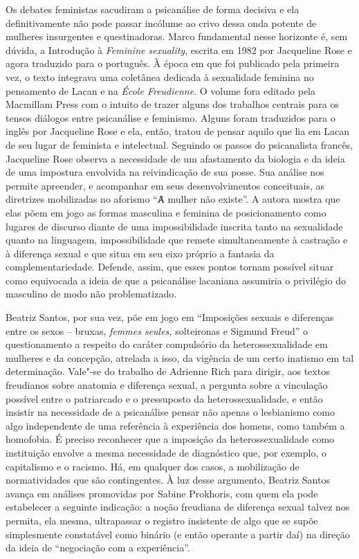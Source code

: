 Os debates feministas sacudiram a psicanálise de forma decisiva e ela
definitivamente não pode passar incólume ao crivo dessa onda potente de
mulheres insurgentes e questinadoras. Marco fundamental nesse horizonte
é, sem dúvida, a Introdução à \emph{Feminine sexuality}, escrita em 1982
por Jacqueline Rose e agora traduzido para o português. À época em que
foi publicado pela primeira vez, o texto integrava uma coletânea
dedicada à sexualidade feminina no pensamento de Lacan e na \emph{École
Freudienne}. O volume fora editado pela Macmillam Press com o intuito de
trazer alguns dos trabalhos centrais para os tensos diálogos entre
psicanálise e feminismo. Alguns foram traduzidos para o inglês por
Jacqueline Rose e ela, então, tratou de pensar aquilo que lia em Lacan
de seu lugar de feminista e intelectual. Seguindo os passos do
psicanalista francês, Jacqueline Rose observa a necessidade de um
afastamento da biologia e da ideia de uma impostura envolvida na
reivindicação de sua posse. Sua análise nos permite apreender, e
acompanhar em seus desenvolvimentos conceituais, as diretrizes
mobilizadas no aforismo ``Ⱥ mulher não existe''. A autora mostra que
elas põem em jogo as formas masculina e feminina de posicionamento como
lugares de discurso diante de uma impossibilidade inscrita tanto na
sexualidade quanto na linguagem, impossibilidade que remete
simultaneamente à castração e à diferença sexual e que situa em seu eixo
próprio a fantasia da complementariedade. Defende, assim, que esses
pontos tornam possível situar como equivocada a ideia de que a
psicanálise lacaniana assumiria o privilégio do masculino de modo não
problematizado.

Beatriz Santos, por sua vez, põe em jogo em ``Imposições sexuais e
diferenças entre os sexos -- bruxas, \emph{femmes seules,} solteironas e
Sigmund Freud'' o questionamento a respeito do caráter compulsório da
heterossexualidade em mulheres e da concepção, atrelada a isso, da
vigência de um certo inatismo em tal determinação. Vale"-se do trabalho
de Adrienne Rich para dirigir, aos textos freudianos sobre anatomia e
diferença sexual, a pergunta sobre a vinculação possível entre o
patriarcado e o pressuposto da heterossexualidade, e então insistir na
necessidade de a psicanálise pensar não apenas o lesbianismo como algo
independente de uma referência à experiência dos homens, como também a
homofobia. É preciso reconhecer que a imposição da heterossexualidade
como instituição envolve a mesma necessidade de diagnóstico que, por
exemplo, o capitalismo e o racismo. Há, em qualquer dos casos, a
mobilização de normatividades que são contingentes. À luz desse
argumento, Beatriz Santos avança em análises promovidas por Sabine
Prokhoris, com quem ela pode estabelecer a seguinte indicação: a noção
freudiana de diferença sexual talvez nos permita, ela mesma, ultrapassar
o registro insistente de algo que se supõe simplesmente constatável como
binário (e então operante a partir daí) na direção da ideia de
``negociação com a experiência''.

